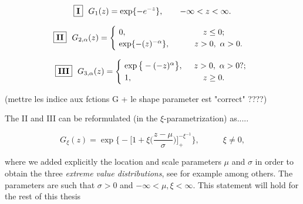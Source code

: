 \documentclass[11pt,a4paper,openany ]{book}
\begin{document}
\begin{equation}\label{gumb}
\boxed{\textbf{\text{I}}}\ \   G_1(z)= 
\exp\{-e^{-z}\}, \ \ \ \ \ \ -\infty<z<\infty.    
\end{equation}


\begin{equation} \label{frech}
\boxed{\textbf{\text{II}}} \ \ G_{2,\alpha}(z)=
\begin{cases}
\ 0, \ \ \ \ \ \ \ \ \ \ \ \ \ \ \ \ \ \ \ \ \ \ \ \ \quad \ z\leq 0; \\
\ \exp\{-(z)^{-\alpha}\}, \ \ \ \ \ \ \ \ \ z>0,\ \alpha>0.    
\end{cases}
\end{equation}

\begin{equation} \label{weib}
\ \ \boxed{\textbf{\text{III}}} \ \ G_{3,\alpha}(z)=\begin{cases}
\ \exp\big\{-(-z)^{\alpha}\big\}, \ \ \ \  z>0,\ \alpha>0?;     \\
\  1, \ \ \ \ \ \ \ \ \ \ \ \ \ \ \ \ \ \ \ \ \ \ \ \quad z\geq 0.
\end{cases}
\end{equation}

(mettre les indice aux fctions G + le shape parameter est "correct" ????)

The II and III can be reformulated (in the $\xi$-parametrization) as.....

\begin{equation}\label{GEVxineq0}
G_{\xi}(z)=\exp\Bigg\{-\bigg[1+\xi \bigg(\frac{z-\mu}{\sigma}\bigg)\bigg]_+^{-\xi^{-1}}\Bigg\}, \ \ \ \ \ \ \ \ \ \ \ \ \  \xi\neq 0,
\end{equation}

where we added explicitly the location and scale parameters $\mu$ and $\sigma$ in order to obtain the three \emph{extreme value distributions}, see for example \cite[pp.16]{reiss_statistical_2007} among others. The parameters are such that $ \sigma>0$ and $-\infty<\mu,\xi<\infty$.
This statement will hold for the rest of this thesis
\end{document}

